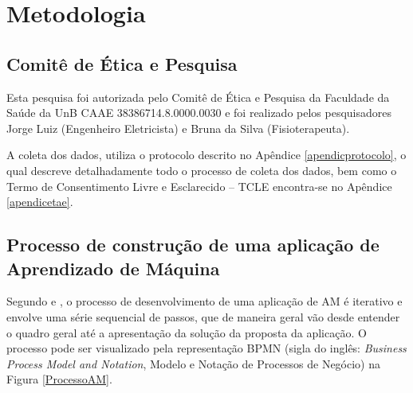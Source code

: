 \chapter{Metodologia}
\section{Comitê de Ética e Pesquisa}
Esta pesquisa foi autorizada pelo Comitê de Ética e Pesquisa da Faculdade da Saúde da UnB CAAE 38386714.8.0000.0030 e foi realizado pelos pesquisadores Jorge Luiz (Engenheiro Eletricista) e Bruna da Silva (Fisioterapeuta).

A coleta dos dados, utiliza o protocolo descrito no Apêndice \ref{apendicprotocolo}, o qual descreve detalhadamente todo o processo de coleta dos dados, bem como o Termo de Consentimento Livre e Esclarecido – TCLE encontra-se no  Apêndice \ref{apendicetae}.

\section{Processo de construção de uma aplicação de Aprendizado de Máquina}

Segundo  e , o processo de desenvolvimento de uma aplicação de AM é iterativo e envolve uma série sequencial de passos, que de maneira geral vão desde entender o quadro geral até a apresentação da solução da proposta da aplicação. O processo pode ser visualizado pela representação BPMN (sigla do inglês: \textit{Business Process Model and Notation}, Modelo e Notação de Processos de Negócio) na Figura \ref{ProcessoAM}.

